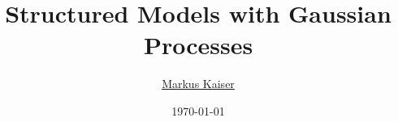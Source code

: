 \title{Structured Models with Gaussian Processes}
\author{\href{mailto:markus@zfix.org}{Markus Kaiser}}
\date{\today}
\newcommand{\acceptdate}{\today}

\renewcommand\maketitle{
}
